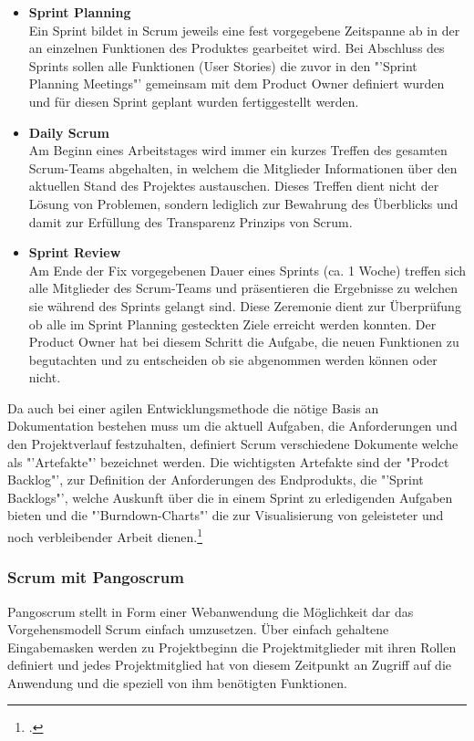 \begin{itemize}
\item \textbf{Sprint Planning}\\
Ein Sprint bildet in Scrum jeweils eine fest vorgegebene Zeitspanne ab in der an einzelnen Funktionen des Produktes gearbeitet wird. Bei Abschluss des Sprints sollen alle Funktionen (User Stories) die zuvor in den "'Sprint Planning Meetings"' gemeinsam mit dem Product Owner definiert wurden und für diesen Sprint geplant wurden fertiggestellt werden.
\item \textbf{Daily Scrum}\\
Am Beginn eines Arbeitstages wird immer ein kurzes Treffen des gesamten Scrum-Teams abgehalten, in welchem die Mitglieder Informationen über den aktuellen Stand des Projektes austauschen. Dieses Treffen dient nicht der Lösung von Problemen, sondern lediglich zur Bewahrung des Überblicks und damit zur Erfüllung des Transparenz Prinzips von Scrum.
\item \textbf{Sprint Review}\\
Am Ende der Fix vorgegebenen Dauer eines Sprints (ca. 1 Woche) treffen sich alle Mitglieder des Scrum-Teams und präsentieren die Ergebnisse zu welchen sie während des Sprints gelangt sind. Diese Zeremonie dient zur Überprüfung ob alle im Sprint Planning gesteckten Ziele erreicht werden konnten. Der Product Owner hat bei diesem Schritt die Aufgabe, die neuen Funktionen zu begutachten und zu entscheiden ob sie abgenommen werden können oder nicht.
\end{itemize}

Da auch bei einer agilen Entwicklungsmethode die nötige Basis an Dokumentation bestehen muss um die aktuell Aufgaben, die Anforderungen und den Projektverlauf festzuhalten, definiert Scrum verschiedene Dokumente welche als "'Artefakte"' bezeichnet werden. Die wichtigsten Artefakte sind der "Prodct Backlog"', zur Definition der Anforderungen des Endprodukts, die "'Sprint Backlogs"', welche Auskunft über die in einem Sprint zu erledigenden Aufgaben bieten und die "'Burndown-Charts"' die zur Visualisierung von geleisteter und noch verbleibender Arbeit dienen.\footcite[vgl.][]{scrum}

\subsubsection{Scrum mit Pangoscrum}
Pangoscrum stellt in Form einer Webanwendung die Möglichkeit dar das Vorgehensmodell Scrum einfach umzusetzen. Über einfach gehaltene Eingabemasken werden zu Projektbeginn die Projektmitglieder mit ihren Rollen definiert und jedes Projektmitglied hat von diesem Zeitpunkt an Zugriff auf die Anwendung und die speziell von ihm benötigten Funktionen.

